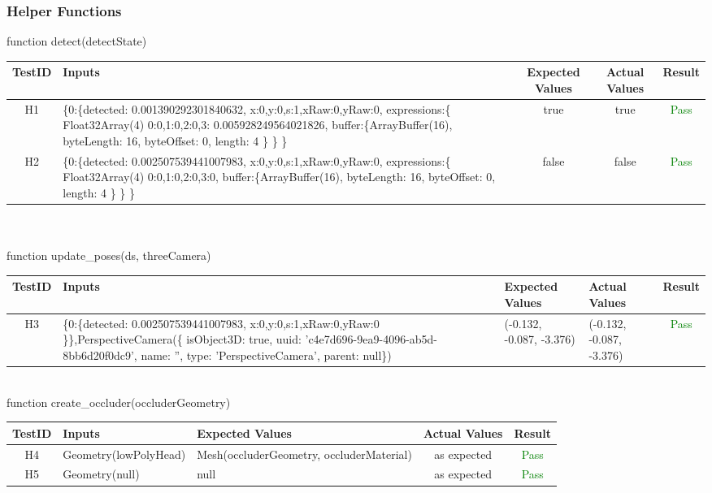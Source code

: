 \documentclass[12pt, oneside, openany, titlepage]{article}
\begin{document}
\subsubsection{Helper Functions}
function detect(detectState)\\
\begin{tabular}{ |c|p{5cm}|c|c|c| } 
 \hline
 TestID & Inputs & Expected Values & Actual Values & Result \\ 
 \hline
 H1 & \{0:\{detected: 0.001390292301840632, x:0,y:0,s:1,xRaw:0,yRaw:0, expressions:\{
Float32Array(4) 0:0,1:0,2:0,3: 0.005928249564021826,
buffer:\{ArrayBuffer(16), byteLength: 16, byteOffset: 0, length: 4
\}
\}
 \} & true & true & \textcolor{green}{Pass} \\ 

 H2 & \{0:\{detected: 0.002507539441007983, x:0,y:0,s:1,xRaw:0,yRaw:0, expressions:\{
Float32Array(4) 0:0,1:0,2:0,3:0,
buffer:\{ArrayBuffer(16), byteLength: 16, byteOffset: 0, length: 4
\}
\}
 \} & false & false & \textcolor{green}{Pass} \\ 
 \hline
\end{tabular}\\
\\
function update\_poses(ds, threeCamera)\\
\begin{tabular}{ |c|p{5cm}|p{3cm}|p{3cm}|c| } 
 \hline
 TestID & Inputs & Expected Values & Actual Values & Result \\ 
 \hline
 H3 & \{0:\{detected: 0.002507539441007983, x:0,y:0,s:1,xRaw:0,yRaw:0
\}\},PerspectiveCamera(\{ isObject3D: true, uuid: 'c4e7d696-9ea9-4096-ab5d-8bb6d20f0dc9', name: '', type: 'PerspectiveCamera', parent: null\}) & (-0.132, -0.087, -3.376) & (-0.132, -0.087, -3.376) & \textcolor{green}{Pass} \\ 
 \hline
\end{tabular}
\\
function create\_occluder(occluderGeometry)\\
\begin{tabular}{ |c|p{5cm}|p{4.6cm}|c|c| } 
 \hline
 TestID & Inputs & Expected Values & Actual Values & Result \\ 
 \hline
 H4 & Geometry(lowPolyHead) & Mesh(occluderGeometry, occluderMaterial) & as expected & \textcolor{green}{Pass} \\ 
 H5 & Geometry(null) & null & as expected & \textcolor{green}{Pass} \\ 
 \hline
\end{tabular}
\\
\end{document}
